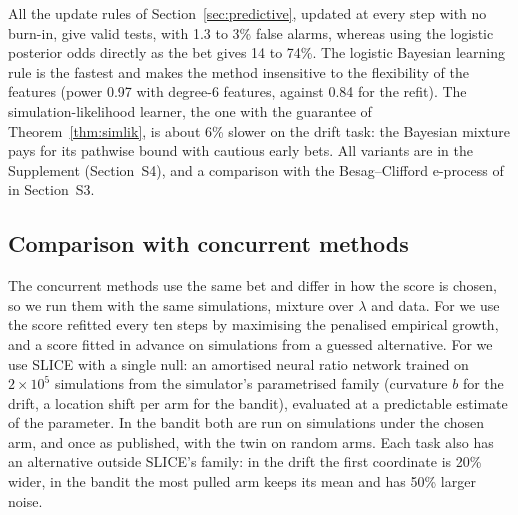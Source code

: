 \documentclass[12pt]{article}
\theoremstyle{remark}
\begin{document}
All the update rules of Section~\ref{sec:predictive}, updated at every step
with no burn-in, give valid tests, with 1.3 to 3\% false alarms, whereas using
the logistic posterior odds directly as the bet gives 14 to 74\%. The logistic
Bayesian learning rule is the fastest and makes the method insensitive to the
flexibility of the features (power 0.97 with degree-6 features, against 0.84
for the refit). The simulation-likelihood learner, the one with the guarantee
of Theorem~\ref{thm:simlik}, is about 6\% slower on the drift task: the
Bayesian mixture pays for its pathwise bound with cautious early bets. All
variants are in the Supplement (Section~S4), and a comparison with the
Besag--Clifford e-process of \citet{dombowsky2026besag} in Section~S3.

\subsection{Comparison with concurrent methods}\label{sec:exp-concurrent}

The concurrent methods use the same bet and differ in how the score is
chosen, so we run them with the same simulations, mixture over $\lambda$ and
data. For \citet{forre2026anytime} we use the score refitted every ten steps by
maximising the penalised empirical growth, and a score fitted in advance on
simulations from a guessed alternative. For \citet{cortinovis2026slice} we use
SLICE with a single null: an amortised neural ratio network trained on
$2 \times 10^5$ simulations from the simulator's parametrised family
(curvature $b$ for the drift, a location shift per arm for the bandit),
evaluated at a predictable estimate of the parameter. In the bandit both are
run on simulations under the chosen arm, and once as published, with the twin
on random arms. Each task also has an alternative outside SLICE's family: in
the drift the first coordinate is 20\% wider, in the bandit the most pulled
arm keeps its mean and has 50\% larger noise.
\end{document}
